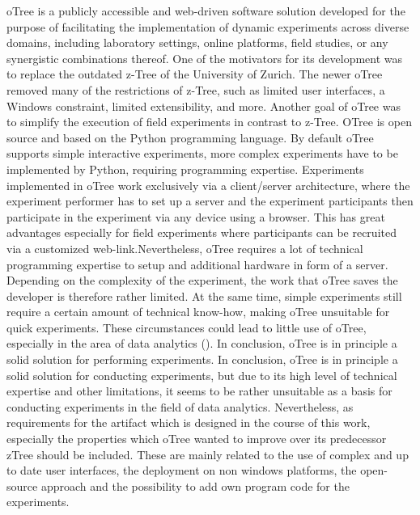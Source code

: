 oTree is a publicly accessible and web-driven software solution developed for the purpose of facilitating the implementation of dynamic experiments across diverse domains, including laboratory settings, online platforms, field studies, or any synergistic combinations thereof. One of the motivators for its development was to replace the outdated z-Tree of the University of Zurich. The newer oTree removed many of the restrictions of z-Tree, such as limited user interfaces, a Windows constraint, limited extensibility, and more. Another goal of oTree was to simplify the execution of field experiments in contrast to z-Tree. OTree is open source and based on the Python programming language. By default oTree supports simple interactive experiments, more complex experiments have to be implemented by Python, requiring programming expertise. Experiments implemented in oTree work exclusively via a client/server architecture, where the experiment performer has to set up a server and the experiment participants then participate in the experiment via any device using a browser. This has great advantages especially for field experiments where participants can be recruited via a customized web-link.Nevertheless, oTree requires a lot of technical programming expertise to setup and additional hardware in form of a server. Depending on the complexity of the experiment, the work that oTree saves the developer is therefore rather limited. At the same time, simple experiments still require a certain amount of technical know-how, making oTree unsuitable for quick experiments. These circumstances could lead to little use of oTree, especially in the area of data analytics (\cite{Chen.2016}). In conclusion, oTree is in principle a solid solution for performing experiments. In conclusion, oTree is in principle a solid solution for conducting experiments, but due to its high level of technical expertise and other limitations, it seems to be rather unsuitable as a basis for conducting experiments in the field of data analytics. Nevertheless, as requirements for the artifact which is designed in the course of this work, especially the properties which oTree wanted to improve over its predecessor zTree should be included. These are mainly related to the use of complex and up to date user interfaces, the deployment on non windows platforms, the open-source approach and the possibility to add own program code for the experiments.

